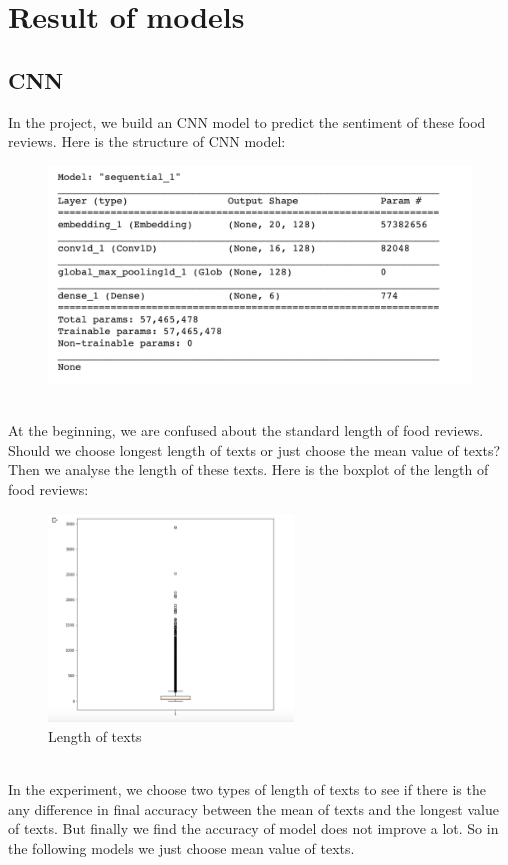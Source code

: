 \documentclass{article}
\begin{document}
\section{Result of models}
\subsection{CNN}
In the project, we build an CNN model to predict the sentiment of these food reviews. Here is the structure of CNN model:\\
\begin{figure}[htbp]
\centering
\includegraphics[scale=0.4]{stru1.png}
\end{figure}\\
At the beginning, we are confused about the standard length of food reviews. Should we choose longest length of texts or just choose the mean value of texts? Then we analyse the length of these texts. Here is the boxplot of the length of food reviews:\\
\begin{figure}[h]
\centering
\includegraphics[width=6.5cm]{m4.png}
\caption{Length of texts}
\end{figure}\\
In the experiment, we choose two types of length of texts to see if there is the any difference in final accuracy between the mean of texts and the longest value of texts. But finally we find the accuracy of model does not improve a lot. So in the following models we just choose mean value of texts.\\
\end{document}
